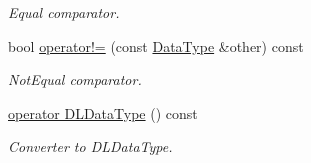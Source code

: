 \begin{DoxyCompactItemize}
\begin{DoxyCompactList}\small\item\em Equal comparator. \end{DoxyCompactList}\item 
bool \hyperlink{classtvm_1_1runtime_1_1DataType_a5a41d89517a2ba67eaa7bd6b6f6c0b90}{operator!=} (const \hyperlink{classtvm_1_1runtime_1_1DataType}{Data\+Type} \&other) const 
\begin{DoxyCompactList}\small\item\em Not\+Equal comparator. \end{DoxyCompactList}\item 
\hyperlink{classtvm_1_1runtime_1_1DataType_ab5fd476a3db6699ddb5a41236653fbd7}{operator D\+L\+Data\+Type} () const 
\begin{DoxyCompactList}\small\item\em Converter to D\+L\+Data\+Type. \end{DoxyCompactList}\end{DoxyCompactItemize}
